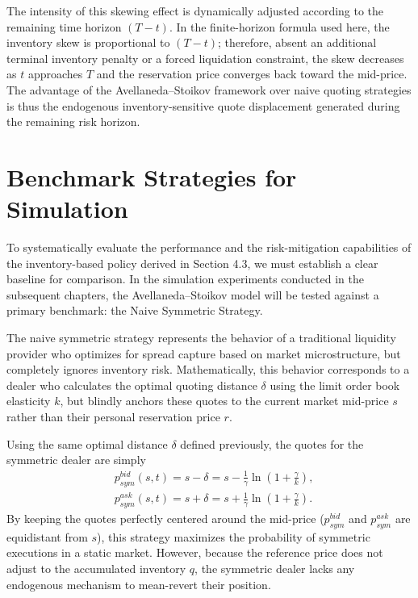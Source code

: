 \documentclass[a4paper,10pt,titlepage,oneside,openany]{book}
\theoremstyle{plain}\newtheorem{theorem}{Theorem}[chapter]
\theoremstyle{definition}\newtheorem{definition}{Definition}[chapter]
\theoremstyle{remark}\newtheorem{remark}{Remark}[chapter]
\begin{document}
The intensity of this skewing effect is dynamically adjusted according to the remaining time horizon $(T-t)$. In the finite-horizon formula used here, the inventory skew is proportional to $(T-t)$; therefore, absent an additional terminal inventory penalty or a forced liquidation constraint, the skew decreases as $t$ approaches $T$ and the reservation price converges back toward the mid-price. The advantage of the Avellaneda--Stoikov framework over naive quoting strategies is thus the endogenous inventory-sensitive quote displacement generated during the remaining risk horizon.

\section{Benchmark Strategies for Simulation}

To systematically evaluate the performance and the risk-mitigation capabilities of the inventory-based policy derived in Section 4.3, we must establish a clear baseline for comparison. In the simulation experiments conducted in the subsequent chapters, the Avellaneda--Stoikov model will be tested against a primary benchmark: the Naive Symmetric Strategy.

The naive symmetric strategy represents the behavior of a traditional liquidity provider who optimizes for spread capture based on market microstructure, but completely ignores inventory risk. Mathematically, this behavior corresponds to a dealer who calculates the optimal quoting distance $\delta$ using the limit order book elasticity $k$, but blindly anchors these quotes to the current market mid-price $s$ rather than their personal reservation price $r$.

Using the same optimal distance $\delta$ defined previously, the quotes for the symmetric dealer are simply
\begin{align*}
    &p^{bid}_{sym}(s,t) = s - \delta = s - \frac{1}{\gamma} \ln \left( 1 + \frac{\gamma}{k} \right),\\
    &p^{ask}_{sym}(s,t) = s + \delta = s + \frac{1}{\gamma} \ln \left( 1 + \frac{\gamma}{k} \right).
\end{align*}
By keeping the quotes perfectly centered around the mid-price ($p^{bid}_{sym}$ and $p^{ask}_{sym}$ are equidistant from $s$), this strategy maximizes the probability of symmetric executions in a static market. However, because the reference price does not adjust to the accumulated inventory $q$, the symmetric dealer lacks any endogenous mechanism to mean-revert their position. 
\end{document}
